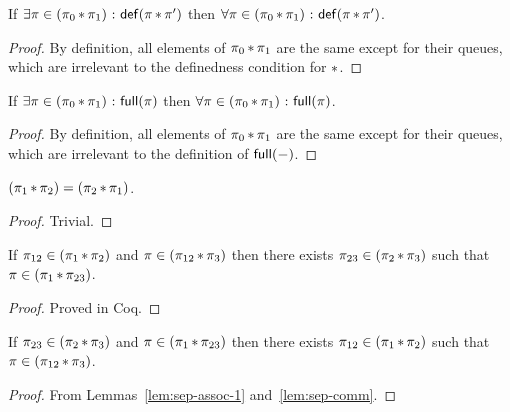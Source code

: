 \documentclass[11pt]{report}
\begin{document}
\begin{lemma}
	\label{lem:sep-def-uniform}
	If $\exists \pi \in (\pi_0 \operatorname{\ast} \pi_1) \operatorname{\,:\,} \mathsf{def}(\pi \operatorname{\ast} \pi')$ then $\forall \pi \in (\pi_0 \operatorname{\ast} \pi_1) \operatorname{\,:\,} \mathsf{def}(\pi \operatorname{\ast} \pi')$. 
\end{lemma}

\begin{proof}
	By definition, all elements of $\pi_0 \operatorname{\ast} \pi_1$ are the same except for their queues, which are irrelevant to the definedness condition for $\operatorname{\ast}$. 
\end{proof}

\begin{lemma}
	\label{lem:full-uniform}
	If $\exists \pi \in (\pi_0 \operatorname{\ast} \pi_1) \operatorname{\,:\,} \mathsf{full}(\pi)$ then $\forall \pi \in (\pi_0 \operatorname{\ast} \pi_1) \operatorname{\,:\,} \mathsf{full}(\pi)$. 
\end{lemma}

\begin{proof}
	By definition, all elements of $\pi_0 \operatorname{\ast} \pi_1$ are the same except for their queues, which are irrelevant to the definition of $\mathsf{full}(-)$. 
\end{proof}

\begin{lemma}[Commutativity]
	\label{lem:sep-comm}
	$(\pi_1 \operatorname{\ast} \pi_2) = (\pi_2 \operatorname{\ast} \pi_1)$. 
\end{lemma}

\begin{proof}
	Trivial. 
\end{proof}

\begin{lemma}[Associativity-1]
	\label{lem:sep-assoc-1}
	If $\pi_{12} \in (\pi_1 \operatorname{\ast} \pi_2)$ and $\pi \in (\pi_{12} \operatorname{\ast} \pi_3)$ then there exists $\pi_{23} \in (\pi_2 \operatorname{\ast} \pi_3)$ such that $\pi \in (\pi_1 \operatorname{\ast} \pi_{23})$. 
\end{lemma}

\begin{proof}
	Proved in Coq.
\end{proof}

\begin{lemma}
	\label{lem:sep-assoc-2}
	If $\pi_{23} \in (\pi_2 \operatorname{\ast} \pi_3)$ and $\pi \in (\pi_1 \operatorname{\ast} \pi_{23})$ then there exists $\pi_{12} \in (\pi_1 \operatorname{\ast} \pi_2)$ such that $\pi \in (\pi_{12} \operatorname{\ast} \pi_3)$. 
\end{lemma}

\begin{proof}
	From Lemmas~\ref{lem:sep-assoc-1} and~\ref{lem:sep-comm}. 
\end{proof}
\end{document}
